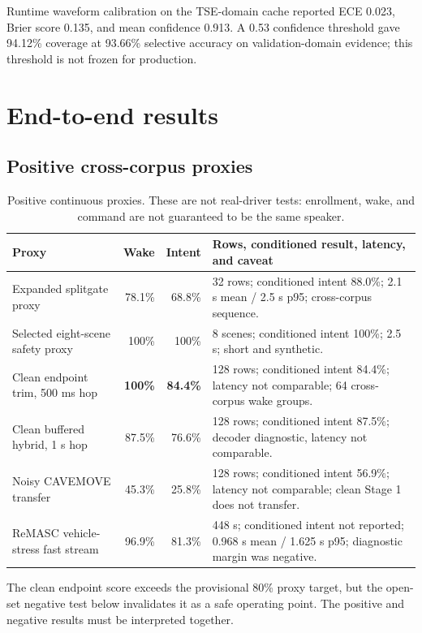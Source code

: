 \documentclass[11pt,a4paper]{article}
\begin{document}
Runtime waveform calibration on the TSE-domain cache reported ECE 0.023,
Brier score 0.135, and mean confidence 0.913. A 0.53 confidence threshold
gave 94.12\% coverage at 93.66\% selective accuracy on validation-domain
evidence; this threshold is not frozen for production.

\section{End-to-end results}

\subsection{Positive cross-corpus proxies}

\begin{table}[H]
\centering
\caption{Positive continuous proxies. These are not real-driver tests:
enrollment, wake, and command are not guaranteed to be the same speaker.}
\label{tab:positive-proxies}
\footnotesize
\begin{tabularx}{\linewidth}{@{}p{3.2cm}rrY@{}}
\toprule
\textbf{Proxy} & \textbf{Wake} & \textbf{Intent} & \textbf{Rows, conditioned result, latency, and caveat}\\
\midrule
Expanded splitgate proxy & 78.1\% & 68.8\% & 32 rows; conditioned intent 88.0\%; 2.1 s mean / 2.5 s p95; cross-corpus sequence.\\
Selected eight-scene safety proxy & 100\% & 100\% & 8 scenes; conditioned intent 100\%; 2.5 s; short and synthetic.\\
Clean endpoint trim, 500 ms hop & \textbf{100\%} & \textbf{84.4\%} & 128 rows; conditioned intent 84.4\%; latency not comparable; 64 cross-corpus wake groups.\\
Clean buffered hybrid, 1 s hop & 87.5\% & 76.6\% & 128 rows; conditioned intent 87.5\%; decoder diagnostic, latency not comparable.\\
Noisy CAVEMOVE transfer & 45.3\% & 25.8\% & 128 rows; conditioned intent 56.9\%; latency not comparable; clean Stage 1 does not transfer.\\
ReMASC vehicle-stress fast stream & 96.9\% & 81.3\% & 448 s; conditioned intent not reported; 0.968 s mean / 1.625 s p95; diagnostic margin was negative.\\
\bottomrule
\end{tabularx}
\end{table}

The clean endpoint score exceeds the provisional 80\% proxy target, but the
open-set negative test below invalidates it as a safe operating point. The
positive and negative results must be interpreted together.
\end{document}
